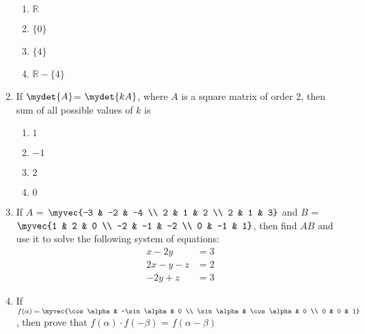 \documentclass{article}
\begin{document}
\begin{enumerate}
\begin{enumerate}
			\item $\mathbb{R}$
	\item $\{0\}$
			\item $\{4\}$
			\item $\mathbb{R}-\{4\}$
		\end{enumerate}
\item If $\mydet {A} $= $\mydet{kA}$, where $A$ is a square matrix of order 2, then sum of all possible values of $k$ is
	\begin{enumerate}
		\item $1$
		\item $-1$
		\item $2$
		\item $0$
	\end{enumerate}
\item If $A$ = $\myvec
	        {-3 & -2 & -4 \\
		2 & 1 & 2 \\
                2 & 1 & 3}$ and $B$ = $\myvec		               {1 & 2 & 0 \\ 
                -2 & -1 & -2 \\ 
                0 & -1 & 1}$, then find $AB$ and use it to solve the following system of equations:  
\[
\begin{aligned}
x - 2y &= 3 \\
2x - y - z &= 2 \\
-2y + z &= 3
\end{aligned}
\]		
\item If $f(\alpha) = \myvec
	{\cos \alpha & -\sin \alpha &  0 \\
	\sin \alpha & \cos \alpha & 0 \\ 
	0 & 0 & 1}$, then prove that $f(\alpha) \cdot f(-\beta)$ = $f(\alpha - \beta)$
\end{enumerate}
\end{document}
